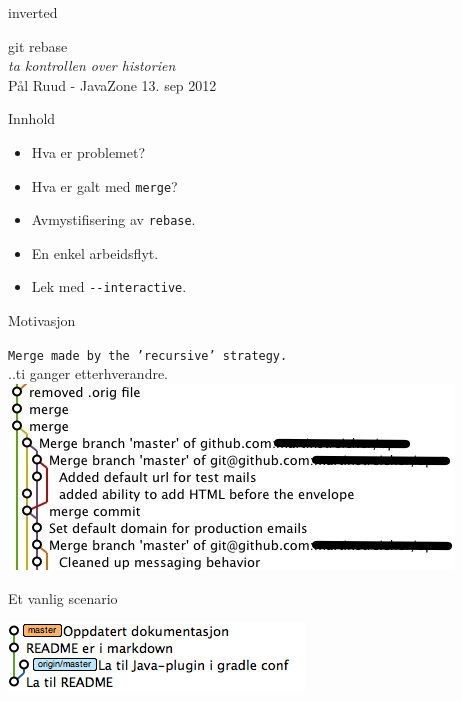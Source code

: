 \documentclass{beamer}
\begin{document}
\begin{frame}
    \begin{beamercolorbox}[ignorebg]{inverted}
    \begin{center}
        \Huge{git rebase}\\
        \vspace{0.5cm}
        \large{\emph{ta kontrollen over historien}}\\
        \vspace{1cm}
        \small{Pål Ruud - JavaZone 13. sep 2012}
    \end{center}
    \end{beamercolorbox}%
\end{frame}

\begin{frame}{Innhold}
    \begin{itemize}
        \item Hva er problemet?
        \item Hva er galt med \lstinline$merge$?
        \item Avmystifisering av \lstinline$rebase$.
        \item En enkel arbeidsflyt.
        \item Lek med \lstinline$--interactive$.
    \end{itemize}
\end{frame}

\begin{frame}{Motivasjon}
    \begin{center}
        \texttt{Merge made by the 'recursive' strategy.}\\
        \pause
        ..ti ganger etterhverandre.
        \medskip
        \pause
        \includegraphics[scale=0.7]{merge_commits.jpg}
    \end{center}
\end{frame}

\begin{frame}{Et vanlig scenario}
    \begin{center}
        \includegraphics[scale=0.7]{1.png}
    \end{center}
\end{frame}
\end{document}
